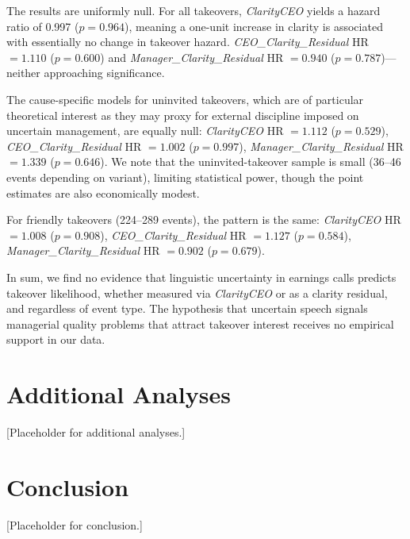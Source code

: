 \documentclass[12pt,a4paper]{article}
\begin{document}
The results are uniformly null. For all takeovers, \textit{ClarityCEO} yields a hazard ratio of 0.997 ($p = 0.964$), meaning a one-unit increase in clarity is associated with essentially no change in takeover hazard. \textit{CEO\_Clarity\_Residual} HR $= 1.110$ ($p = 0.600$) and \textit{Manager\_Clarity\_Residual} HR $= 0.940$ ($p = 0.787$)---neither approaching significance.

The cause-specific models for uninvited takeovers, which are of particular theoretical interest as they may proxy for external discipline imposed on uncertain management, are equally null: \textit{ClarityCEO} HR $= 1.112$ ($p = 0.529$), \textit{CEO\_Clarity\_Residual} HR $= 1.002$ ($p = 0.997$), \textit{Manager\_Clarity\_Residual} HR $= 1.339$ ($p = 0.646$). We note that the uninvited-takeover sample is small (36--46 events depending on variant), limiting statistical power, though the point estimates are also economically modest.

For friendly takeovers (224--289 events), the pattern is the same: \textit{ClarityCEO} HR $= 1.008$ ($p = 0.908$), \textit{CEO\_Clarity\_Residual} HR $= 1.127$ ($p = 0.584$), \textit{Manager\_Clarity\_Residual} HR $= 0.902$ ($p = 0.679$).

In sum, we find no evidence that linguistic uncertainty in earnings calls predicts takeover likelihood, whether measured via \textit{ClarityCEO} or as a clarity residual, and regardless of event type. The hypothesis that uncertain speech signals managerial quality problems that attract takeover interest receives no empirical support in our data.

\section{Additional Analyses}
\label{sec:additional}

[Placeholder for additional analyses.]

\section{Conclusion}
\label{sec:conclusion}

[Placeholder for conclusion.]
\end{document}
